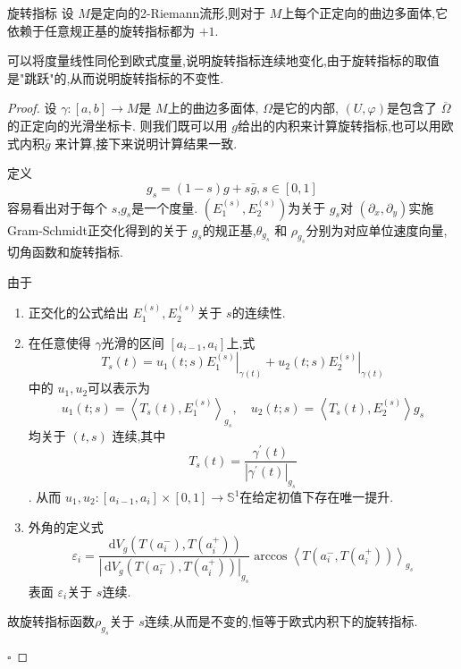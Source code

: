 \documentclass[../../几何与拓扑.tex]{subfiles}
\begin{document}
\begin{lemma}{旋转指标}
    设 \(  M  \)是定向的2-Riemann流形,则对于 \(  M  \)上每个正定向的曲边多面体,它依赖于任意规正基的旋转指标都为 \(  + 1  \).       
\end{lemma}

\begin{note}
    可以将度量线性同伦到欧式度量,说明旋转指标连续地变化,由于旋转指标的取值是"跳跃"的,从而说明旋转指标的不变性.
\end{note}

\begin{proof}
    设 \(   \gamma :\left[ a,b \right]\to M   \)是 \(  M  \)上的曲边多面体, \(   \Omega   \)是它的内部, \(  \left( U, \varphi  \right)   \)是包含了 \(  \overline{ \Omega }  \)的正定向的光滑坐标卡.   则我们既可以用 \(  g  \)给出的内积来计算旋转指标,也可以用欧式内积\(  \bar{g}  \) 来计算,接下来说明计算结果一致.
    
    定义 \[
    g_{s}= \left( 1-s \right)g+ s \bar{g}, s \in \left[ 0,1 \right] 
    \] 容易看出对于每个 \(  s  \),\(  g_{s}  \)是一个度量.  \(  \left( E_1^{\left( s \right) },E_2^{\left( s \right) } \right)   \)为关于 \(  g_{s}  \)对 \(  \left(  \partial _{x}, \partial _{y} \right)   \)实施Gram-Schmidt正交化得到的关于 \(  g_{s}  \)的规正基,\(  \theta _{g_{s}}  \)     和 \(  \rho _{g_{s}}  \)分别为对应单位速度向量,切角函数和旋转指标. 

    由于
    \begin{enumerate}
        \item 正交化的公式给出 \(  E_1^{\left( s \right) },E_2^{\left( s \right) }  \)关于  \(  s  \)的连续性.
        \item 在任意使得 \(   \gamma   \)光滑的区间 \(  \left[ a_{i-1},a_{i} \right]   \)上,式   \[
        T_{s}\left( t \right) = u_1\left( t;s \right)\left. E_1^{\left( s \right) } \right|_{ \gamma \left( t \right) }+ u_2\left( t;s \right)\left. E_2^{\left( s \right) } \right|_{ \gamma \left( t \right) }  
        \] 中的 \(  u_1,u_2  \)可以表示为 \[
        u_1\left( t;s \right)= \left<T_{s}\left( t \right),E_1^{\left( s \right) }  \right>_{g_{s}},\quad u_2\left( t;s \right)= \left<T_{s}\left( t \right),E_2^{\left( s \right) }  \right>g_{s}  
        \]均关于  \(  \left( t,s \right)   \) 连续,其中 \[
        T_{s}\left( t \right)= \frac{ \gamma ^{\prime} \left( t \right)  }{\left|  \gamma ^{\prime} \left( t \right)  \right|_{g_{s}}  }  
        \].  从而 \(  u_1,u_2:\left[ a_{i-1},a_{i} \right]\times \left[ 0,1 \right]\to \mathbb{S}^{1}    \)在给定初值下存在唯一提升.
        \item 外角的定义式 \[
         \varepsilon _{i}= \frac{\,\mathrm{d} V_{g}\left( T\left( a_{i}^{-} \right)  ,T\left( a_{i}^{+ } \right) \right)  }{ \left| \,\mathrm{d} V_{g}\left( T\left( a_{i}^{-} \right),T\left( a_{i}^{+ } \right)   \right)  \right|_{g_{s}} }\arccos \left<T\left( a_{i}^{-},T\left( a_{i}^{+ } \right)  \right)  \right>_{g_{s}} 
        \]表面 \(   \varepsilon _{i}  \)关于 \(  s  \)连续.  
    \end{enumerate}
    故旋转指标函数\(  \rho _{g_{s}}  \)关于 \(  s  \)连续,从而是不变的,恒等于欧式内积下的旋转指标.  

    \hfill $\square$
\end{proof}
\end{document}
